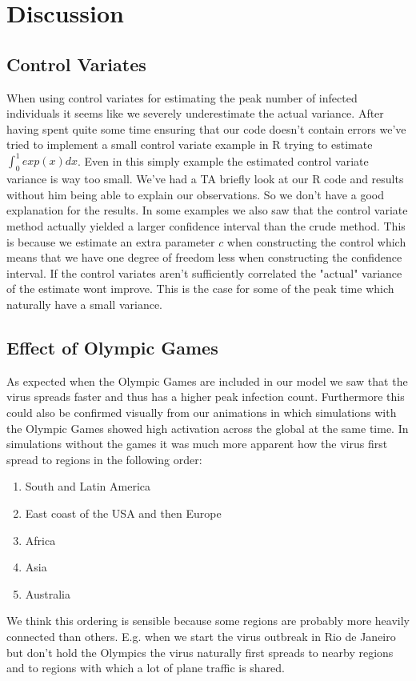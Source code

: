 
\section{Discussion}
\subsection{Control Variates}
When using control variates for estimating the peak number of infected individuals it seems like we severely underestimate the actual variance. After having spent quite some time ensuring that our code doesn't contain errors we've tried to implement a small control variate example in R trying to estimate $\int_0^1 exp(x) dx$. Even in this simply example the estimated control variate variance is way too small. We've had a TA briefly look at our R code and results without him being able to explain our observations. So we don't have a good explanation for the results.
	In some examples we also saw that the control variate method actually yielded a larger confidence interval than the crude method. This is because we estimate an extra parameter $c$ when constructing the control which means that we have one degree of freedom less when constructing the confidence interval. If the control variates aren't sufficiently correlated the "actual" variance of the estimate wont improve. This is the case for some of the peak time which naturally have a small variance.

\subsection{Effect of Olympic Games}
As expected when the Olympic Games are included in our model we saw that the virus spreads faster and thus has a higher peak infection count. Furthermore this could also be confirmed visually from our animations in which simulations with the Olympic Games showed high activation across the global at the same time. In simulations without the games it was much more apparent how the virus first spread to regions in the following order:
\begin{enumerate}
	\item South and Latin America
	\item  East coast of the USA and then Europe
	\item Africa
	\item Asia
	\item Australia
\end{enumerate}

We think this ordering is sensible because some regions are probably more heavily connected than others. E.g. when we start the virus outbreak in Rio de Janeiro but don't hold the Olympics the virus naturally  first spreads to nearby regions and to regions with which a lot of plane traffic is shared.
